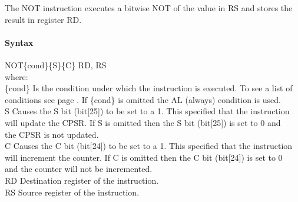 \documentclass[12pt]{article}
\begin{document}
    \noindent
    The NOT instruction executes a bitwise NOT of the value in RS and stores the result in register RD. 
    
    \paragraph{Syntax}
    \begin{flushleft}
    NOT\{cond\}\{S\}\{C\} RD, RS\\
    \vspace{1em}        %
    where:\\
    \vspace{1em}
    \{cond\}    \hspace{2em} Is the condition under which the instruction is executed. To see a list of\\
                \hspace{5.4em} conditions see page . If \{cond\} is omitted the AL (always) condition is used.\\
    \vspace{1em}    
    S       \hspace{4.5em} Causes the S bit (bit[25]) to be set to a 1. This specified that the instruction\\
            \hspace{5.4em} will update the CPSR. If S is omitted then the S bit (bit[25]) is set to 0 and\\
            \hspace{5.4em} the CPSR is not updated.\\
    \vspace{1em}    
    C       \hspace{4.5em} Causes the C bit (bit[24]) to be set to a 1. This specified that the instruction\\
            \hspace{5.4em} will increment the counter. If C is omitted then the C bit (bit[24]) is set to 0\\
            \hspace{5.4em} and the counter will not be incremented.\\
    \vspace{1em}
    RD  \hspace{3.6em} Destination register of the instruction.\\
    \vspace{1em}
    RS  \hspace{3.85em} Source register of the instruction.\\
    \end{flushleft}
    
\end{document}
